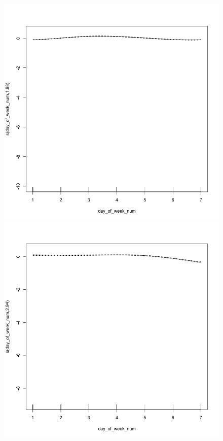 \documentclass{beamer}
\begin{document}
\begin{frame}
\begin{figure}
\includegraphics[scale=.13]{figures/og4}
\includegraphics[scale=.13]{figures/shrinkage4}
\end{figure}

\end{frame}
\end{document}
